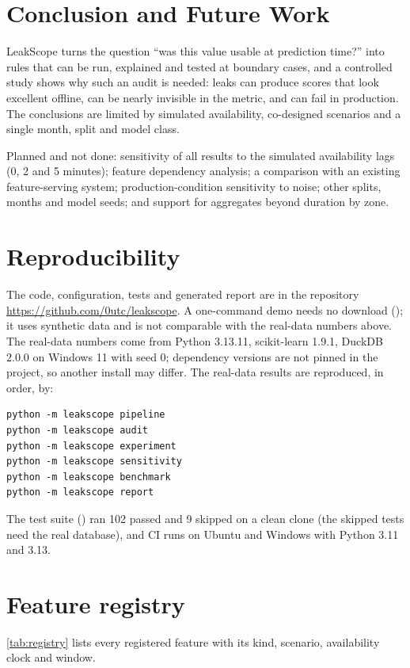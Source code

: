\documentclass[11pt,a4paper]{article}
\newcommand{\ft}[1]{\texttt{\detokenize{#1}}}
\begin{document}
\section{Conclusion and Future Work}\label{sec:future}
LeakScope turns the question ``was this value usable at prediction time?'' into rules that can be run, explained and tested at boundary cases, and a controlled study shows why such an audit is needed: leaks can produce scores that look excellent offline, can be nearly invisible in the metric, and can fail in production. The conclusions are limited by simulated availability, co-designed scenarios and a single month, split and model class.

Planned and not done: sensitivity of all results to the simulated availability lags (0, 2 and 5 minutes); feature dependency analysis; a comparison with an existing feature-serving system; production-condition sensitivity to noise; other splits, months and model seeds; and support for aggregates beyond duration by zone.

\section{Reproducibility}
The code, configuration, tests and generated report are in the repository \url{https://github.com/0utc/leakscope}. A one-command demo needs no download (\ft{python -m leakscope demo}); it uses synthetic data and is not comparable with the real-data numbers above. The real-data numbers come from Python 3.13.11, scikit-learn 1.9.1, DuckDB 2.0.0 on Windows 11 with seed 0; dependency versions are not pinned in the project, so another install may differ. The real-data results are reproduced, in order, by:
\begin{verbatim}
python -m leakscope pipeline
python -m leakscope audit
python -m leakscope experiment
python -m leakscope sensitivity
python -m leakscope benchmark
python -m leakscope report
\end{verbatim}
The test suite (\ft{pytest}) ran 102 passed and 9 skipped on a clean clone (the skipped tests need the real database), and CI runs on Ubuntu and Windows with Python 3.11 and 3.13.

\clearpage
\appendix
\section{Feature registry}
\autoref{tab:registry} lists every registered feature with its kind, scenario, availability clock and window.
\end{document}
